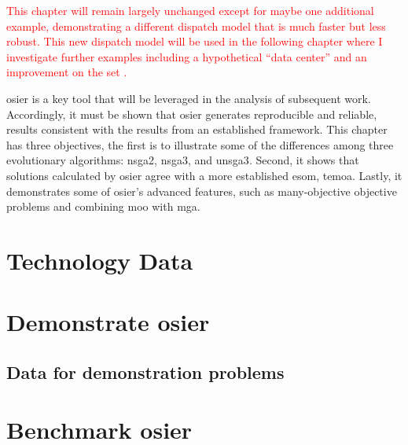 \textcolor{red}{This chapter will remain largely unchanged except for maybe one
additional example, demonstrating a different dispatch model that is much faster
but less robust. This new dispatch model will be used in the following chapter
where I investigate further examples including a hypothetical ``data center''
and an improvement on the \acf{set} \cite{wigeland_nuclear_2014}.}

\ac{osier} is a key tool that will be leveraged in the analysis of subsequent
work. Accordingly, it must be shown that \ac{osier} generates reproducible and
reliable, results consistent with the results from an established framework.
This chapter has three objectives, the first is to illustrate some of the
differences among three evolutionary algorithms: \ac{nsga2}, \ac{nsga3}, and
\ac{unsga3}. Second, it shows that solutions calculated by \ac{osier} agree with
a more established \ac{esom}, \ac{temoa}. Lastly, it demonstrates some of
\ac{osier}'s advanced features, such as many-objective objective problems and
combining \ac{moo} with \ac{mga}.

\section{Technology Data}

\section{Demonstrate \ac{osier}}
\subsection{Data for demonstration problems}


\section{Benchmark \ac{osier}}




